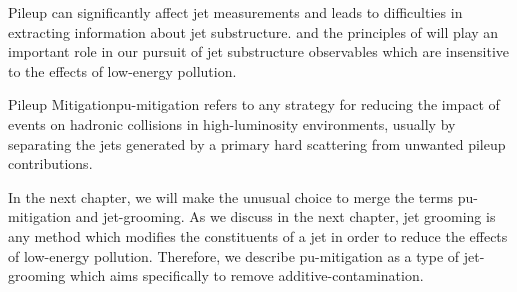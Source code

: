 \begin{subappendices}

Pileup can significantly affect jet measurements and leads to difficulties in extracting information about jet substructure.
%
 and the principles of  will play an important role in our pursuit of jet substructure observables which are insensitive to the effects of low-energy pollution.

\begin{definitionbox}{Pileup Mitigation}{pu-mitigation}
     refers to any strategy for reducing the impact of  events on hadronic collisions in high-luminosity environments, usually by separating the jets generated by a primary hard scattering from unwanted pileup contributions.
\end{definitionbox}

In the next chapter, we will make the unusual choice to merge the terms \gls{pu-mitigation} and \gls{jet-grooming}.
%
As we discuss in the next chapter, jet grooming is any method which modifies the constituents of a jet in order to reduce the effects of low-energy pollution.
%
Therefore, we describe \gls{pu-mitigation} as a type of \gls{jet-grooming} which aims specifically to remove \gls{additive-contamination}.
\end{subappendices}



